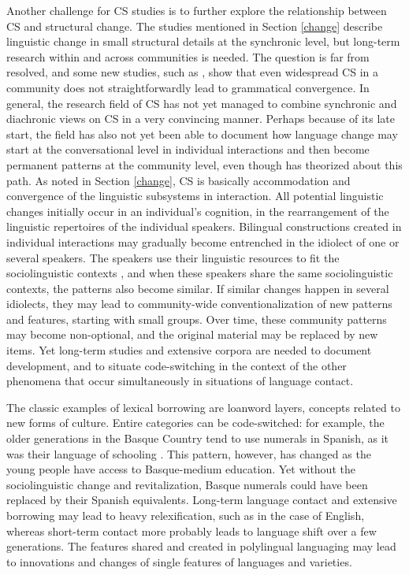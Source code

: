 \documentclass[output=paper]{langscibook}
\begin{document}
Another challenge for CS studies is to further explore the relationship between CS and structural change. The studies mentioned in Section \ref{change} describe linguistic change in small structural details at the synchronic level, but long-term research within and across communities is needed.  The question is far from resolved, and some new studies, such as \textcite{cacoullos2018bilingualism}, show that even widespread CS in a community does not straightforwardly lead to grammatical convergence. In general, the research field of CS has not yet managed to combine synchronic and diachronic views on CS in a very convincing manner. Perhaps because of its late start, the field has also not yet been able to document how language change may start at the conversational level in individual interactions and then become permanent patterns at the community level, even though \textcite{matras2009language} has theorized about this path. As noted in Section \ref{change},  CS is basically accommodation and convergence of the linguistic subsystems in interaction. All potential linguistic changes initially occur in an individual's cognition, in the rearrangement of the linguistic repertoires of the individual speakers. Bilingual constructions created in individual interactions may gradually become entrenched in the idiolect of one or several speakers. The speakers use their linguistic resources to fit the sociolinguistic contexts \parencite{heller2007bilingualism}, and when these speakers share the same sociolinguistic contexts, the patterns also become similar. If similar changes happen in several idiolects, they may lead to community-wide conventionalization of new patterns and features, starting with small groups. Over time, these community patterns may become non-optional, and the original material may be replaced by new items. Yet long-term studies and extensive corpora are needed to document development, and to situate code-switching in the context of the other phenomena that occur simultaneously in situations of language contact.

The classic examples of lexical borrowing are loanword layers, concepts related to new forms of culture. Entire categories can be code-switched: for example, the older generations in the Basque Country tend to use numerals in Spanish, as it was their language of schooling \parencite{lantto2015conventionalized}. This pattern, however, has changed as the young people have access to Basque-medium education. Yet without the sociolinguistic change and revitalization, Basque numerals could have been replaced by their Spanish equivalents. Long-term language contact and extensive borrowing may lead to heavy relexification, such as in the case of English, whereas short-term contact more probably leads to language shift over a few generations. The features shared and created in polylingual languaging may lead to innovations and changes of single features of languages and varieties.
\end{document}

